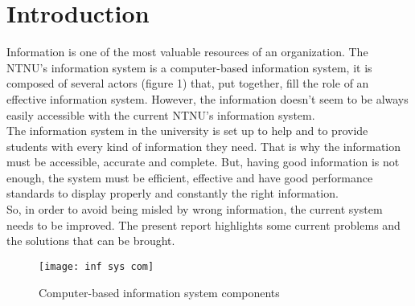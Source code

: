 \section{Introduction}

Information is one of the most valuable resources of an organization. The NTNU’s information system is a computer-based information system, it is composed of several actors (figure 1)  that, put together, fill the role of an effective information system. However, the information doesn’t seem to be always easily accessible with the current NTNU’s information system.\\
The information system in the university is set up to help and to provide students with every kind of information they need. That is why the information must be accessible, accurate and complete. But, having good information is not enough, the system must be efficient, effective and have good performance standards to display properly and constantly the right information.\\
So, in order to avoid being misled by wrong information, the current system needs to be improved. The present report highlights some current problems and the solutions that can be brought.

\begin{figure}[h]
	\begin{center}
		\centerline{\texttt{[image: inf sys com]}}
		\caption[Computer-based information system components]{Computer-based information system components}
		\label{fig:infsyscom}
	\end{center}
\end{figure}
